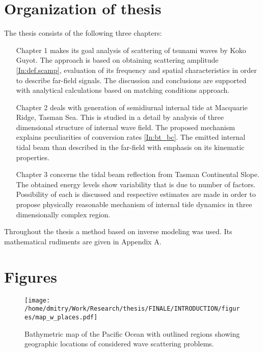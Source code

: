 \documentclass[12pt]{article}
\begin{document}
\section{Organization of thesis}
The thesis consists of the following three chapters:
\begin{enumerate}
	\item[Chapter 1] makes its goal analysis of scattering of tsunami waves by Koko Guyot. The 
	approach is based on obtaining scattering amplitude \eqref{In:def.scamp}, evaluation of its 
	frequency and spatial characteristics in order to describe far-field signals. The discussion 
	and conclusions are supported with analytical calculations based on matching conditions 
	approach.
	\item[Chapter 2] deals with generation of semidiurnal internal tide at Macquarie Ridge,  
	Tasman Sea. This is studied in a detail by analysis of three dimensional structure of 
	internal wave field. The proposed mechanism explains peculiarities of conversion rates 
	\eqref{In:bt_bc}. The emitted internal tidal beam than described in the far-field with emphasis 
	on its kinematic properties.
	\item[Chapter 3] concerns the tidal beam reflection from Tasman Continental Slope. The 
	obtained energy levels show variability that is due to number of factors. Possibility of each 
	is discussed and respective estimates are made in order to propose physically reasonable 
	mechanism of internal tide dynamics in three dimensionally complex region.
\end{enumerate}
Throughout the thesis a method based on inverse modeling was used. Its mathematical rudiments are 
given in Appendix A.

\section*{Figures}
\begin{figure}
	\texttt{[image: /home/dmitry/Work/Research/thesis/FINALE/INTRODUCTION/figures/map\_w\_places.pdf]}
	\caption{Bathymetric map of the Pacific Ocean with outlined regions showing geographic 
	locations of considered wave scattering problems.}
\end{figure}
	
\end{document}
